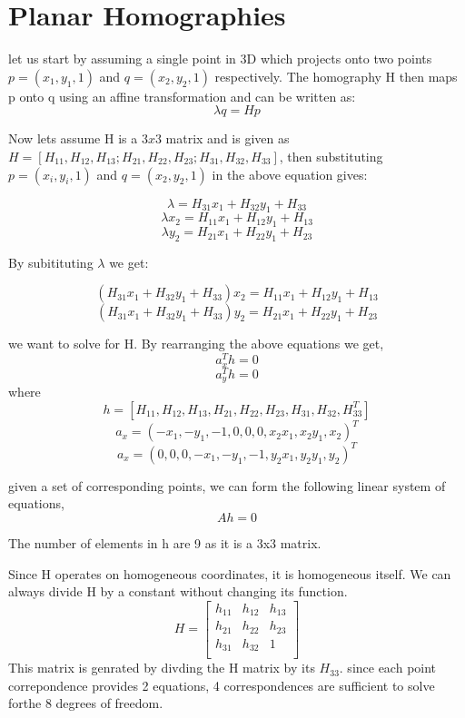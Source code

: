 \documentclass[12pt]{article}
\newenvironment{problem}[2][Problem]{\begin{trivlist}
\item[\hskip \labelsep {\bfseries #1}\hskip \labelsep {\bfseries #2.}]}{\end{trivlist}}
\begin{document}
\section{Planar Homographies}

\begin{problem}{3.1 a)}

let us start by assuming a single point in 3D which projects onto two points  $p = (x_1,y_1,1)$ and $q  = (x_2,y_2,1)$ respectively. The homography H then maps p onto q using an affine transformation and can be written as:
\begin{equation}
\lambda q = H p
\end{equation}

Now lets assume H is a $3x3$ matrix and is given as $H = [H_{11},H_{12},H_{13};H_{21},H_{22},H_{23};H_{31},H_{32},H_{33}]$, then substituting $p = (x_i,y_i,1)$ and $q = (x_2,y_2,1)$ in the above equation gives:

$$\lambda = H_{31}x_1+H_{32}y_1+H_{33}$$
$$\lambda x_2 = H_{11}x_1+H_{12}y_1+H_{13}$$
$$\lambda y_2 = H_{21}x_1+H_{22}y_1+H_{23}$$

By subitituting $\lambda$ we get:

$$(H_{31}x_1+H_{32}y_1+H_{33})x_2 = H_{11}x_1+H_{12}y_1+H_{13}$$
$$(H_{31}x_1+H_{32}y_1+H_{33})y_2 = H_{21}x_1+H_{22}y_1+H_{23}$$

we want to solve for H.  By rearranging the above equations we get,
$$a_{x}^{T}h = 0$$
$$a_{y}^{T}h = 0$$
where \\
$$h = [H_{11},H_{12},H_{13},H_{21},H_{22},H_{23},H
_{31},H_{32},H_{33}^T]$$
$$a_x = (-x_1,-y_1,-1,0,0,0,x_2 x_1, x_2 y_1, x_2)^T$$
$$a_x = (0,0,0,-x_1,-y_1,-1,y_2 x_1, y_2 y_1, y_2)^T$$ 

given a set of corresponding points, we can form the following linear system of equations,
$$Ah = 0$$
\end{problem} 

\begin{problem}{3.1 b)}
The number of elements in h are 9 as it is a 3x3 matrix. 
\end{problem}

\begin{problem}{3.1 c)}
Since H operates on homogeneous coordinates, it is homogeneous itself. We can always divide H by a constant without changing its function.
\[
H = 
 \begin{bmatrix}
  h_{11} & h_{12} & h_{13}\\
  h_{21} & h_{22} & h_{23}\\
  h_{31} & h_{32} & 1\\
 \end{bmatrix}
\]
This matrix is genrated by divding the H matrix by its $H_{33}$. since each point correpondence provides 2 equations, 4 correspondences are sufficient to solve forthe 8 degrees of freedom. 
\end{problem}
\end{document}
